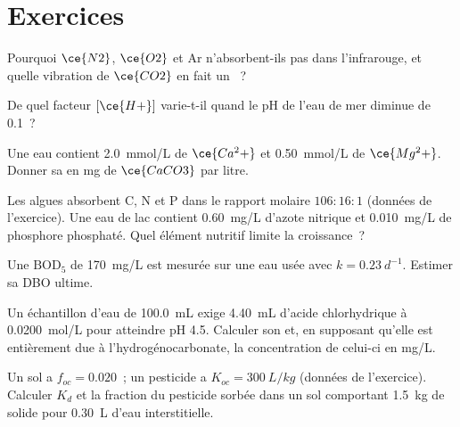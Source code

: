 \section{Exercices}

\begin{exercise}[$\star$]\label{exo:b3:environmental-toxicology:1}
Pourquoi $\ce{N2}$, $\ce{O2}$ et Ar n'absorbent-ils pas dans l'infrarouge, et quelle vibration de $\ce{CO2}$ en fait un
~?
\end{exercise}

\begin{exercise}[$\star$]\label{exo:b3:environmental-toxicology:2}
De quel facteur $[\ce{H+}]$ varie-t-il quand le pH de l'eau de mer diminue de 0.1~?
\end{exercise}

\begin{exercise}[$\star$]\label{exo:b3:environmental-toxicology:3}
Une eau contient \qty{2.0}{mmol/L} de $\ce{Ca^2+}$ et \qty{0.50}{mmol/L} de $\ce{Mg^2+}$. Donner sa  en mg de $\ce{CaCO3}$ par litre.
\end{exercise}

\begin{exercise}[$\star$]\label{exo:b3:environmental-toxicology:4}
Les algues absorbent C, N et P dans le rapport molaire $106 : 16 : 1$ (données de l'exercice). Une eau de lac
contient \qty{0.60}{mg/L} d'azote nitrique et \qty{0.010}{mg/L} de phosphore phosphaté. Quel élément nutritif limite
la croissance~?
\end{exercise}

\begin{exercise}[$\star\star$]\label{exo:b3:environmental-toxicology:5}
Une $\mathrm{BOD_5}$ de \qty{170}{mg/L} est mesurée sur une eau usée avec $k = \qty{0.23}{d^{-1}}$. Estimer sa DBO ultime.
\end{exercise}

\begin{exercise}[$\star\star$]\label{exo:b3:environmental-toxicology:6}
Un échantillon d'eau de \qty{100.0}{mL} exige \qty{4.40}{mL} d'acide chlorhydrique à \qty{0.0200}{mol/L} pour atteindre pH 4.5. Calculer son
 et, en supposant qu'elle est entièrement due à l'hydrogénocarbonate, la concentration de celui-ci en mg/L.
\end{exercise}

\begin{exercise}[$\star\star$]\label{exo:b3:environmental-toxicology:7}
Un sol a $f_{oc} = 0.020$~; un pesticide a $K_{oc} = \qty{300}{L/kg}$ (données de l'exercice). Calculer $K_d$ et la
fraction du pesticide sorbée dans un sol comportant \qty{1.5}{kg} de solide pour \qty{0.30}{L} d'eau interstitielle.
\end{exercise}

